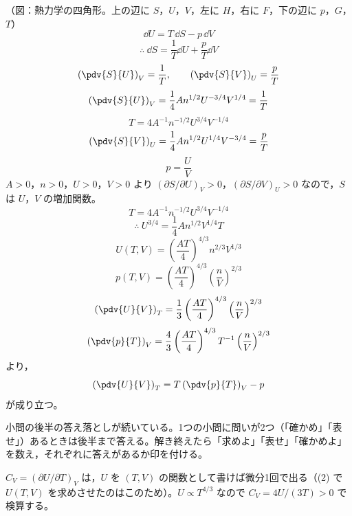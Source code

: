 （図：熱力学の四角形。上の辺に $S$，$U$，$V$，左に $H$，右に $F$，下の辺に $p$，$G$，$T$）
\[ \dd U=T\,\dd S-p\,\dd V \]
\[ \therefore\ \dd S=\frac{1}{T}\dd U+\frac{p}{T}\dd V \]
\[ \left(\pdv{S}{U}\right)_{V}=\frac{1}{T},\qquad\left(\pdv{S}{V}\right)_{U}=\frac{p}{T} \]
\[ \left(\pdv{S}{U}\right)_{V}=\frac{1}{4}An^{1/2}U^{-3/4}V^{1/4}=\frac{1}{T} \]
\[ T=4A^{-1}n^{-1/2}U^{3/4}V^{-1/4} \]
\[ \left(\pdv{S}{V}\right)_{U}=\frac{1}{4}An^{1/2}U^{1/4}V^{-3/4}=\frac{p}{T} \]
\[ p=\frac{U}{V} \]
$A>0$，$n>0$，$U>0$，$V>0$ より $(\partial S/\partial U)_{V}>0$，$(\partial S/\partial V)_{U}>0$ なので，$S$ は $U$，$V$ の増加関数。
\[ T=4A^{-1}n^{-1/2}U^{3/4}V^{-1/4} \]
\[ \therefore\ U^{3/4}=\frac{1}{4}An^{1/2}V^{1/4}T \]
\[ U(T,V)=\left(\frac{AT}{4}\right)^{4/3}n^{2/3}V^{1/3} \]
\[ p(T,V)=\left(\frac{AT}{4}\right)^{4/3}\left(\frac{n}{V}\right)^{2/3} \]
\[ \left(\pdv{U}{V}\right)_{T}=\frac{1}{3}\left(\frac{AT}{4}\right)^{4/3}\left(\frac{n}{V}\right)^{2/3} \]
\[ \left(\pdv{p}{T}\right)_{V}=\frac{4}{3}\left(\frac{AT}{4}\right)^{4/3}T^{-1}\left(\frac{n}{V}\right)^{2/3} \]
より，
\[ \left(\pdv{U}{V}\right)_{T}=T\left(\pdv{p}{T}\right)_{V}-p \]
が成り立つ。
\item {} 小問の後半の答え落としが続いている。1つの小問に問いが2つ（「確かめ」「表せ」）あるときは後半まで答える。解き終えたら「求めよ」「表せ」「確かめよ」を数え，それぞれに答えがあるか印を付ける。
\item $C_{V}=(\partial U/\partial T)_{V}$ は，$U$ を $(T,V)$ の関数として書けば微分1回で出る（(2) で $U(T,V)$ を求めさせたのはこのため）。$U\propto T^{4/3}$ なので $C_{V}=4U/(3T)>0$ で検算する。
